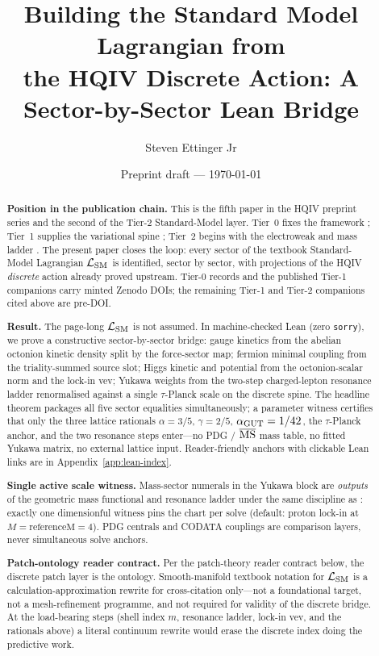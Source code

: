 \documentclass[11pt]{amsart}
\title[SM Lagrangian from HQIV Discrete Action]{Building the Standard Model Lagrangian from\\
the HQIV Discrete Action: A Sector-by-Sector Lean Bridge}
\author{Steven Ettinger Jr}
\date{Preprint draft --- \today}
\begin{document}
\begin{abstract}
\noindent\textbf{Position in the publication chain.}
This is the fifth paper in the HQIV preprint series and the
second of the Tier-2 Standard-Model layer. Tier~0 fixes the
framework \cite{ettinger2026hqiv,hqiv-lightcone-paper,hqiv-so8-paper};
Tier~1 supplies the variational spine
\cite{hqiv-3d-growth-paper,hqiv-oct-action-paper,hqiv-kirchhoff-paper};
Tier~2 begins with the electroweak and mass ladder
\cite{hqiv-mass-spectrum-paper}. The present paper closes the
loop: every sector of the textbook Standard-Model Lagrangian
$\mathcal{L}_{\rm SM}$ is identified, sector by sector, with
projections of the HQIV \emph{discrete} action already proved
upstream. Tier-0 records and the published Tier-1 companions
\cite{hqiv-3d-growth-paper,hqiv-oct-action-paper,hqiv-kirchhoff-paper}
carry minted Zenodo DOIs; the remaining Tier-1 and Tier-2 companions
cited above are pre-DOI.

\noindent\textbf{Result.}
The page-long $\mathcal{L}_{\rm SM}$ is not assumed. In
machine-checked Lean (zero \texttt{sorry}), we prove a
constructive sector-by-sector bridge: gauge kinetics from the
abelian octonion kinetic density split by the force-sector map;
fermion minimal coupling from the triality-summed source slot;
Higgs kinetic and potential from the octonion-scalar norm and
the lock-in vev; Yukawa weights from the two-step charged-lepton
resonance ladder renormalised against a single $\tau$-Planck
scale on the discrete spine. The headline theorem packages all
five sector equalities simultaneously; a parameter witness
certifies that only the three lattice rationals
$\alpha=3/5$, $\gamma=2/5$, $\alpha_{\rm GUT}=1/42$, the
$\tau$-Planck anchor, and the two resonance steps enter---no
PDG / $\overline{\rm MS}$ mass table, no fitted Yukawa matrix,
no external lattice input. Reader-friendly anchors with
clickable Lean links are in Appendix~\ref{app:lean-index}.

\noindent\textbf{Single active scale witness.}
Mass-sector numerals in the Yukawa block are \emph{outputs} of
the geometric mass functional and resonance ladder under the
same discipline as \cite{hqiv-mass-spectrum-paper,hqiv-kirchhoff-paper}:
exactly one dimensionful witness pins the chart per solve (default:
proton lock-in at $M=\mathrm{referenceM}=4$). PDG centrals and
CODATA couplings are comparison layers, never simultaneous solve
anchors.

\noindent\textbf{Patch-ontology reader contract.}
Per the patch-theory reader contract below, the discrete patch
layer is the ontology. Smooth-manifold textbook notation for
$\mathcal{L}_{\rm SM}$ is a calculation-approximation rewrite
for cross-citation only---not a foundational target, not a
mesh-refinement programme, and not required for validity of the
discrete bridge. At the load-bearing steps (shell index $m$,
resonance ladder, lock-in vev, and the rationals above) a literal
continuum rewrite would erase the discrete index doing the
predictive work.


\end{abstract}
\end{document}
